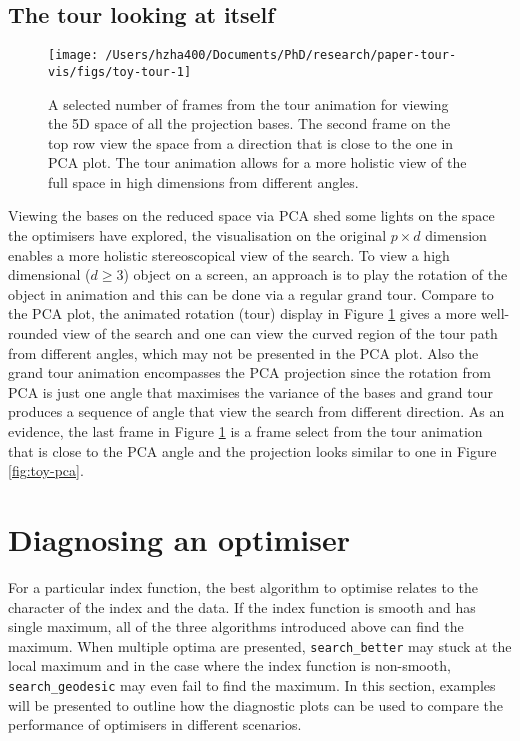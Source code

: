 \documentclass[12pt]{article}
\begin{document}
\hypertarget{the-tour-looking-at-itself}{%
\subsection{The tour looking at itself}\label{the-tour-looking-at-itself}}

\begin{figure}

{\centering \texttt{[image: /Users/hzha400/Documents/PhD/research/paper-tour-vis/figs/toy-tour-1]} 

}

\caption{A selected number of frames from the tour animation for viewing the 5D space of all the projection bases. The second frame on the top row view the space from a direction that is close to the one in PCA plot. The tour animation allows for a more holistic view of the full space in high dimensions from different angles.}\label{fig:toy-tour}
\end{figure}



Viewing the bases on the reduced space via PCA shed some lights on the space the optimisers have explored, the visualisation on the original \(p \times d\) dimension enables a more holistic stereoscopical view of the search. To view a high dimensional (\(d \ge 3\)) object on a screen, an approach is to play the rotation of the object in animation and this can be done via a regular grand tour. Compare to the PCA plot, the animated rotation (tour) display in Figure \ref{fig:toy-tour} gives a more well-rounded view of the search and one can view the curved region of the tour path from different angles, which may not be presented in the PCA plot. Also the grand tour animation encompasses the PCA projection since the rotation from PCA is just one angle that maximises the variance of the bases and grand tour produces a sequence of angle that view the search from different direction. As an evidence, the last frame in Figure \ref{fig:toy-tour} is a frame select from the tour animation that is close to the PCA angle and the projection looks similar to one in Figure \ref{fig:toy-pca}.

\hypertarget{application}{%
\section{Diagnosing an optimiser}\label{application}}

For a particular index function, the best algorithm to optimise relates to the character of the index and the data. If the index function is smooth and has single maximum, all of the three algorithms introduced above can find the maximum. When multiple optima are presented, \texttt{search\_better} may stuck at the local maximum and in the case where the index function is non-smooth, \texttt{search\_geodesic} may even fail to find the maximum. In this section, examples will be presented to outline how the diagnostic plots can be used to compare the performance of optimisers in different scenarios.
\end{document}
